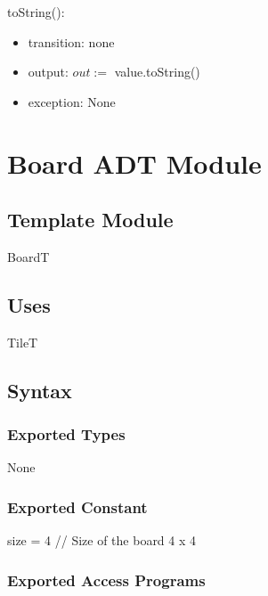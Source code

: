 \documentclass[12pt]{article}
\begin{document}
\noindent toString():
\begin{itemize}
\item transition: none
\item output: $out :=$ value.toString()
\item exception: None
\end{itemize}

\newpage

\section* {Board ADT Module}

\subsection*{Template Module}

BoardT

\subsection* {Uses}

TileT

\subsection* {Syntax}

\subsubsection* {Exported Types}

None

\subsubsection* {Exported Constant}

size = 4 \quad // Size of the board 4 x 4

\subsubsection* {Exported Access Programs}
\end{document}
